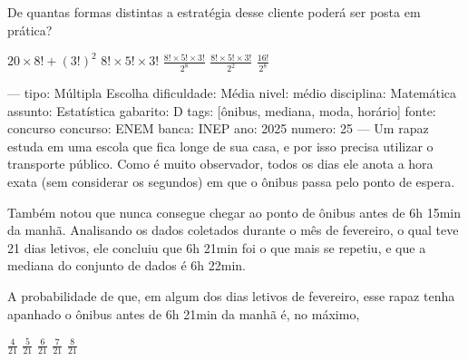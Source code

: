 De quantas formas distintas a estratégia desse cliente poderá ser posta em prática?
\begin{choices}
\choice \( 20 \times 8! + (3!)^2 \)
\CorrectChoice \( 8! \times 5! \times 3! \)
\choice \( \frac{8! \times 5! \times 3!}{2^8} \)
\choice \( \frac{8! \times 5! \times 3!}{2^2} \)
\choice \( \frac{16!}{2^8} \)
\end{choices}

---
tipo: Múltipla Escolha
dificuldade: Média
nivel: médio
disciplina: Matemática
assunto: Estatística
gabarito: D
tags: [ônibus, mediana, moda, horário]
fonte: concurso
concurso: ENEM
banca: INEP
ano: 2025
numero: 25
---
\question
Um rapaz estuda em uma escola que fica longe de sua casa, e por isso precisa utilizar o transporte público. Como é muito observador, todos os dias ele anota a hora exata (sem considerar os segundos) em que o ônibus passa pelo ponto de espera.

Também notou que nunca consegue chegar ao ponto de ônibus antes de 6h 15min da manhã. Analisando os dados coletados durante o mês de fevereiro, o qual teve 21 dias letivos, ele concluiu que 6h 21min foi o que mais se repetiu, e que a mediana do conjunto de dados é 6h 22min.

A probabilidade de que, em algum dos dias letivos de fevereiro, esse rapaz tenha apanhado o ônibus antes de 6h 21min da manhã é, no máximo,
\begin{choices}
\choice \( \frac{4}{21} \)
\choice \( \frac{5}{21} \)
\choice \( \frac{6}{21} \)
\CorrectChoice \( \frac{7}{21} \)
\choice \( \frac{8}{21} \)
\end{choices}
